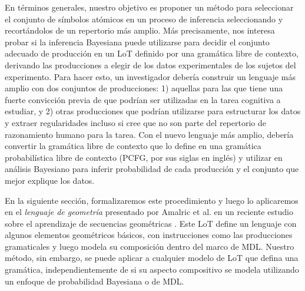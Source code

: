 En términos generales, nuestro objetivo es proponer un método para seleccionar el conjunto de símbolos atómicos en un proceso de inferencia seleccionando y recortándolos de un repertorio más amplio. Más precisamente, nos interesa probar si la inferencia Bayesiana puede utilizarse para decidir el conjunto adecuado de producción en un LoT definido por una gramática libre de contexto, derivando las producciones a elegir de los datos experimentales de los sujetos del experimento. Para hacer esto, un investigador debería construir un lenguaje más amplio con dos conjuntos de producciones: 1) aquellas para las que tiene una fuerte convicción previa de que podrían ser utilizadas en la tarea cognitiva a estudiar, y 2) otras producciones que podrían utilizarse para estructurar los datos y extraer regularidades incluso si cree que no son parte del repertorio de razonamiento humano para la tarea. Con el nuevo lenguaje más amplio, debería convertir la gramática libre de contexto que lo define en una gramática probabilística libre de contexto (PCFG, por sus siglas en inglés) y utilizar en análisis Bayesiano para inferir probabilidad de cada producción y el conjunto que mejor explique los datos.


En la siguiente sección, formalizaremos este procedimiento y luego lo aplicaremos en el \textit{lenguaje de geometría} presentado por Amalric et al. en un reciente estudio sobre el aprendizaje de secuencias geométricas \cite{marie2016}. Este LoT define un lenguaje con algunos elementos geométricos básicos, con instrucciones como las producciones gramaticales y luego modela su composición dentro del marco de MDL. Nuestro método, sin embargo, se puede aplicar a cualquier modelo de LoT que defina una gramática, independientemente de si su aspecto compositivo se modela utilizando un enfoque de probabilidad Bayesiana o de MDL.


